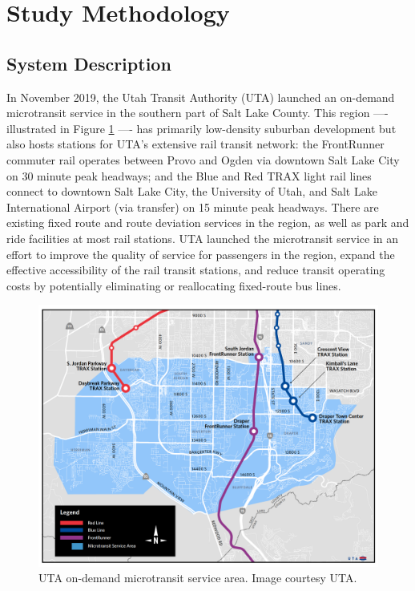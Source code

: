 \documentclass[smartcities,article,submit,moreauthors,pdftex]{mdpi}
\begin{document}
\hypertarget{study-methodology}{%
\section{Study Methodology}\label{study-methodology}}

\hypertarget{system-description}{%
\subsection{System Description}\label{system-description}}

In November 2019, the Utah Transit Authority (UTA) launched an on-demand
microtransit service in the southern part of Salt Lake County. This region ----
illustrated in Figure \ref{fig:via-map} ---- has primarily low-density suburban
development but also hosts stations for UTA's extensive rail transit network:
the FrontRunner commuter rail operates between Provo and Ogden via downtown Salt
Lake City on 30 minute peak headways; and the Blue and Red TRAX light rail lines
connect to downtown Salt Lake City, the University of Utah, and Salt Lake
International Airport (via transfer) on 15 minute peak headways. There are
existing fixed route and route deviation services in the region, as well as park
and ride facilities at most rail stations. UTA launched the microtransit service
in an effort to improve the quality of service for passengers in the region,
expand the effective accessibility of the rail transit stations, and reduce transit
operating costs by potentially eliminating or reallocating fixed-route bus lines.

\begin{figure}
\includegraphics[width=1\linewidth]{images/via-map} \caption{UTA on-demand microtransit service area. Image courtesy UTA.}\label{fig:via-map}
\end{figure}
\end{document}
